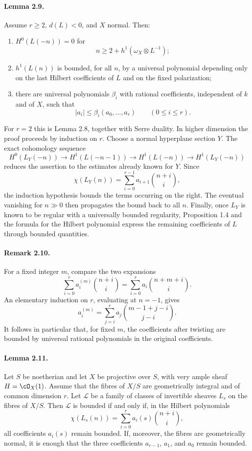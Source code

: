\documentclass[11pt]{article}
\theoremstyle{plain}
\theoremstyle{definition}
\theoremstyle{remark}
\begin{document}
\paragraph{Lemma 2.9.}
Assume $r\geq2$, $d(L)<0$, and $X$ normal. Then:
\begin{enumerate}[label=\roman*)]
\item $H^0(L(-n))=0$ for
\[
n\geq 2+h^1(\omega_X\otimes L^{-1});
\]
\item $h^1(L(n))$ is bounded, for all $n$, by a universal polynomial depending only on the last Hilbert coefficients of $L$ and on the fixed polarization;
\item there are universal polynomials $\beta_i$ with rational coefficients, independent of $k$ and of $X$, such that
\[
|a_i|\leq \beta_i(a_0,\ldots,a_r)\qquad(0\leq i\leq r).
\]
\end{enumerate}

For $r=2$ this is Lemma 2.8, together with Serre duality. In higher dimension the proof proceeds by induction on $r$. Choose a normal hyperplane section $Y$. The exact cohomology sequence
\[
H^0(L_Y(-n))\to H^1(L(-n-1))\to H^1(L(-n))\to H^1(L_Y(-n))
\]
reduces the assertion to the estimates already known for $Y$. Since
\[
\chi(L_Y(n))=\sum_{i=0}^{r-1}a_{i+1}\binom{n+i}{i},
\]
the induction hypothesis bounds the terms occurring on the right. The eventual vanishing for $n\gg0$ then propagates the bound back to all $n$. Finally, once $L_Y$ is known to be regular with a universally bounded regularity, Proposition 1.4 and the formula for the Hilbert polynomial express the remaining coefficients of $L$ through bounded quantities.

\paragraph{Remark 2.10.}
For a fixed integer $m$, compare the two expansions
\[
\sum_{i=0}^r a_i^{(m)}\binom{n+i}{i}
 =\sum_{i=0}^r a_i\binom{n+m+i}{i}.
\]
An elementary induction on $r$, evaluating at $n=-1$, gives
\[
a_i^{(m)}=\sum_{j=i}^r a_j\binom{m-1+j-i}{j-i}.
\]
It follows in particular that, for fixed $m$, the coefficients after twisting are bounded by universal rational polynomials in the original coefficients.

\paragraph{Lemma 2.11.}
Let $S$ be noetherian and let $X$ be projective over $S$, with very ample sheaf $H=\cO_X(1)$. Assume that the fibres of $X/S$ are geometrically integral and of common dimension $r$. Let $\mathscr L$ be a family of classes of invertible sheaves $L_s$ on the fibres of $X/S$. Then $\mathscr L$ is bounded if and only if, in the Hilbert polynomials
\[
\chi(L_s(n))=\sum_{i=0}^r a_i(s)\binom{n+i}{i},
\]
all coefficients $a_i(s)$ remain bounded. If, moreover, the fibres are geometrically normal, it is enough that the three coefficients $a_{r-1}$, $a_1$, and $a_0$ remain bounded.
\end{document}
